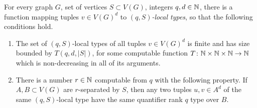 \begin{lemma}\label{pro:crossing}	
For
every graph $G$, set of vertices $S\subset V(G)$, integers $q,d\in\mathbb{N}$, 
there is a  function mapping tuples  $v\in V(G)^d$
	to \emph{$(q,S)$-local types},
so that the following conditions 
hold.
	 \begin{enumerate}[(1)]
	 	\item\label{c:number} The  set of  $(q,S)$-local types  of all tuples $v\in V(G)^d$  is finite and has size bounded by 
    $T(q,d,|S|)$, for some computable function $T\colon \mathbb{N}\times \mathbb{N}\times\mathbb{N}\to \mathbb{N}$ which is non-decreasing in all of its arguments.

	
		

		
	 	\item\label{c:confusing}
		 	  There is a number 
		 $r\in\mathbb{N}$ computable from $q$ with the following property. 
		 If $A,B\subset V(G)$ are 
 $r$-separated by $S$,
then any two tuples $u,v\in A^d$
		 of the same $(q,S)$-local type
have
		 the same  quantifier rank $q$ type
		 over $B$.
	 \end{enumerate}
\end{lemma}

